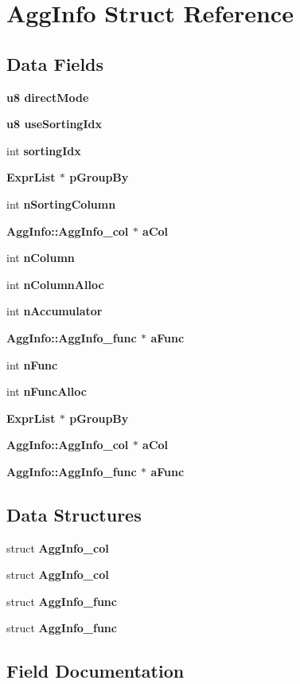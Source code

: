 \section{Agg\-Info Struct Reference}
\label{structAggInfo}
\subsection*{Data Fields}
\begin{CompactItemize}
\item 
\bf{u8} \bf{direct\-Mode}
\item 
\bf{u8} \bf{use\-Sorting\-Idx}
\item 
int \bf{sorting\-Idx}
\item 
\bf{Expr\-List} $\ast$ \bf{p\-Group\-By}
\item 
int \bf{n\-Sorting\-Column}
\item 
\bf{Agg\-Info::Agg\-Info\_\-col} $\ast$ \bf{a\-Col}
\item 
int \bf{n\-Column}
\item 
int \bf{n\-Column\-Alloc}
\item 
int \bf{n\-Accumulator}
\item 
\bf{Agg\-Info::Agg\-Info\_\-func} $\ast$ \bf{a\-Func}
\item 
int \bf{n\-Func}
\item 
int \bf{n\-Func\-Alloc}
\item 
\bf{Expr\-List} $\ast$ \bf{p\-Group\-By}
\item 
\bf{Agg\-Info::Agg\-Info\_\-col} $\ast$ \bf{a\-Col}
\item 
\bf{Agg\-Info::Agg\-Info\_\-func} $\ast$ \bf{a\-Func}
\end{CompactItemize}
\subsection*{Data Structures}
\begin{CompactItemize}
\item 
struct \bf{Agg\-Info\_\-col}
\item 
struct \bf{Agg\-Info\_\-col}
\item 
struct \bf{Agg\-Info\_\-func}
\item 
struct \bf{Agg\-Info\_\-func}
\end{CompactItemize}


\subsection{Field Documentation}
